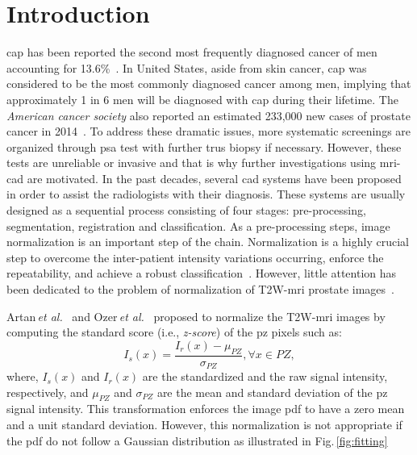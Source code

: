 \graphicspath{ {./content/intro/figures/} }

\section{Introduction}
\label{sec:intro}  %

\Ac{cap} has been reported the second most frequently diagnosed cancer of men accounting for 13.6\%~\cite{ferlay2010estimates}. 
In United States, aside from skin cancer, \ac{cap} was considered to be the most commonly diagnosed cancer among men, implying that approximately 1 in 6 men will be diagnosed with \ac{cap} during their lifetime.
The \textit{American cancer society} also reported an estimated 233,000 new cases of prostate cancer in 2014~\cite{CancerFactsFigures2014}. 
To address these dramatic issues, more systematic screenings are organized through \ac{psa} test with further \ac{trus} biopsy if necessary.
However, these tests are unreliable or invasive and that is why further investigations using \ac{mri}-\ac{cad} are motivated. 
In the past decades, several \ac{cad} systems have been proposed in order to assist the radiologists with their diagnosis. 
These systems are usually designed as a sequential process consisting of four stages: pre-processing, segmentation, registration and classification.
As a pre-processing steps, image normalization is an important step of the chain.
Normalization is a highly crucial step to overcome the inter-patient intensity variations occurring, enforce the repeatability, and achieve a robust classification~\cite{Lemaitre2015}.
However, little attention has been dedicated to the problem of normalization of T2W-\ac{mri} prostate images~\cite{Lemaitre2015}.

Artan\,\textit{et al.}~\cite{artan2010prostate,artan2009prostate} and Ozer\,\textit{et al.}~\cite{ozer2009prostate,ozer2010supervised} proposed to normalize the T2W-\ac{mri} images by computing the standard score (i.e., \textit{z-score}) of the \ac{pz} pixels such as: 
\begin{equation}
  I_{s}(x) = \frac{I_{r}(x) - \mu_{PZ}}{\sigma_{PZ}}, \forall x\in PZ ,
  \label{eq:zscore}
\end{equation}
\noindent where, $I_{s}(x)$ and $I_{r}(x)$ are the standardized and the raw signal intensity, respectively, and $\mu_{PZ}$ and $\sigma_{PZ}$ are the mean and standard deviation of the \ac{pz} signal intensity. 
This transformation enforces the image \ac{pdf} to have a zero mean and a unit standard deviation.
However, this normalization is not appropriate if the \ac{pdf} do not follow a Gaussian distribution as illustrated in Fig.\,\ref{fig:fitting}

